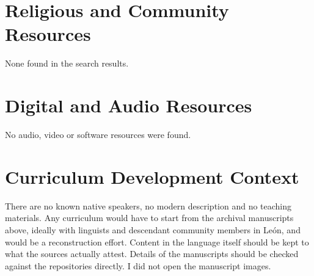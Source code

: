 \documentclass[12pt]{article}
\begin{document}
\section{Religious and Community Resources}
None found in the search results.

\section{Digital and Audio Resources}
No audio, video or software resources were found.

\section{Curriculum Development Context}
There are no known native speakers, no modern description and no teaching materials. Any curriculum would have to start from the archival manuscripts above, ideally with linguists and descendant community members in Le\'on, and would be a reconstruction effort. Content in the language itself should be kept to what the sources actually attest. Details of the manuscripts should be checked against the repositories directly. I did not open the manuscript images.
\end{document}
